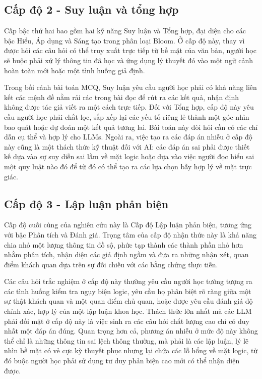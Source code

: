\subsection{Cấp độ 2 - Suy luận và tổng hợp}

Cấp bậc thứ hai bao gồm hai kỹ năng Suy luận và Tổng hợp, đại diện cho các bậc Hiểu, Áp dụng và Sáng tạo trong phân loại Bloom. Ở cấp độ này, thay vì được hỏi các câu hỏi có thể truy xuất trực tiếp từ bề mặt của văn bản, người học sẽ buộc phải xử lý thông tin đã học và ứng dụng lý thuyết đó vào một ngữ cảnh hoàn toàn mới hoặc một tình huống giả định.

Trong bối cảnh bài toán MCQ, Suy luận yêu cầu người học phải có khả năng liên kết các mệnh đề nằm rải rác trong bài đọc để rút ra các kết quả, nhận định không được tác giả viết ra một cách trực tiếp. Đối với Tổng hợp, cấp độ này yêu cầu người học phải chắt lọc, sắp xếp lại các yếu tố riêng lẻ thành một góc nhìn bao quát hoặc dự đoán một kết quả tương lai. Bài toán này đòi hỏi cần có các chỉ dẫn cụ thể và hợp lý cho LLMs. Ngoài ra, việc tạo ra các đáp án nhiễu ở cấp độ này cũng là một thách thức kỹ thuật đối với AI: các đáp án sai phải được thiết kế dựa vào sự suy diễn sai lầm về mặt logic hoặc dựa vào việc người đọc hiểu sai một quy luật nào đó để từ đó có thể tạo ra các lựa chọn bẫy hợp lý về mặt trực giác.

\subsection{Cấp độ 3 - Lập luận phản biện}

Cấp độ cuối cùng của nghiên cứu này là Cấp độ Lập luận phản biện, tương ứng với bậc Phân tích và Đánh giá. Trọng tâm của cấp độ nhận thức này là khả năng chia nhỏ một lượng thông tin đồ sộ, phức tạp thành các thành phần nhỏ hơn nhằm phân tích, nhận diện các giả định ngầm và đưa ra những nhận xét, quan điểm khách quan dựa trên sự đối chiếu với các bằng chứng thực tiễn.

Các câu hỏi trắc nghiệm ở cấp độ này thường yêu cầu người học tưởng tượng ra các tình huống kiểm tra ngụy biện logic, yêu cầu họ phân biệt rõ ràng giữa một sự thật khách quan và một quan điểm chủ quan, hoặc được yêu cầu đánh giá độ chính xác, hợp lý của một lập luận khoa học. Thách thức lớn nhất mà các LLM phải đối mặt ở cấp độ này là việc sinh ra các câu hỏi chất lượng cao chỉ có duy nhất một đáp án đúng. Quan trọng hơn cả, phương án nhiễu ở mức độ này không thể chỉ là những thông tin sai lệch thông thường, mà phải là các lập luận, lý lẽ nhìn bề mặt có vẻ cực kỳ thuyết phục nhưng lại chứa các lỗ hổng về mặt logic, từ đó buộc người học phải sử dụng tư duy phản biện cao mới có thể nhận diện được.

